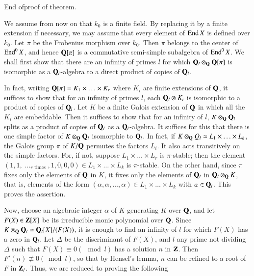 \begin{romanstep}\label{apen1-step7}
End of\pageoriginale proof of theorem.
\end{romanstep}

We assume from now on that $k_0$ is a finite field. By replacing it by a finite extension if necessary, we may assume that every element of $\operatorname{End} X$ is defined over $k_0$. Let $\pi$ be the Frobenius morphism over $k_0$. Then $\pi$ belongs to the center of $\operatorname{End}^0 X$, and hence $\mathbf{Q}[\pi]$ is a commutative semi-simple subalgebra of $\operatorname{End}^0 X$. We shall first show that there are an infinity of primes $l$ for which $\mathbf{Q}_l \otimes_{\mathbf{Q}} \mathbf{Q}[\pi]$ is isomorphic as a $\mathbf{Q}_l$-algebra to a direct product of copies of $\mathbf{Q}_l$.

In fact, writing $\mathbf{Q}[\pi] = K_1 \times \ldots \times K_r$ where $K_i$ are finite extensions of $\mathbf{Q}$, it suffices to show that for an infinity of primes $l$, each $\mathbf{Q}_l \otimes K_i$ is isomorphic to a product of copies of $\mathbf{Q}_l$. Let $K$ be a finite Galois extension of $\mathbf{Q}$ in which all the $K_i$ are embeddable. Then it suffices to show that for an infinity of $l$, $K \otimes_{\mathbf{Q}} \mathbf{Q}_l$ splits as a product of copies of $\mathbf{Q}_l$ as a $\mathbf{Q}_l$-algebra. It suffices for this that there is one simple factor of $K \otimes_{\mathbf{Q}} \mathbf{Q}_l$ isomorphic to $\mathbf{Q}_l$. In fact, if $K \otimes_{\mathbf{Q}} Q_l \simeq L_1\times \ldots \times L_k$, the Galois group $\pi$ of $K/\mathbf{Q}$ permutes the factors $L_i$. It also acts transitively on the simple factors. For, if not, suppose $L_1 \times \ldots \times L_r$ is $\pi$-stable; then the element $(1, 1,{\displaystyle\mathop{\ldots}_{r \text{ times}}}, 1, 0,0,0) \in L_1 \times \ldots \times L_k$ is $\pi$-stable. On the other hand, since $\pi$ fixes only the elements of $\mathbf{Q}$ in $K$, it fixes only the elements of $\mathbf{Q}_l$ in $\mathbf{Q}_l\otimes_{\mathbf{Q}} K$, that is, elements of the form $(\alpha, \alpha,\ldots, \alpha) \in L_1 \times \ldots \times L_k$ with $\alpha \in \mathbf{Q}_l$. This proves the assertion.
 
Now, choose an algebraic integer $\alpha$ of $K$ generating $K$ over $\mathbf{Q}$, and let $F(X)\in \mathbf{Z}[X]$ be its irreducible monic polynomial over $\mathbf{Q}$. Since $K \otimes_{\mathbf{Q}} \mathbf{Q}_l \simeq \mathbf{Q}_l[X]/(F(X))$, it is enough to find an infinity of $l$ for which $F(X)$ has a zero in $\mathbf{Q}_l$. Let $\Delta$ be the discriminant of $F(X)$, and $l$ any prime not dividing $\Delta$ such that $F(X) \equiv 0 (\mod l)$ has a solution $n$ in $\mathbf{Z}$. Then $F'(n)\nequiv0(\bmod l)$, so that by Hensel's lemma, $n$ can be refined to a root of $F$ in $\mathbf{Z}_l$. Thus, we are reduced to proving the following

